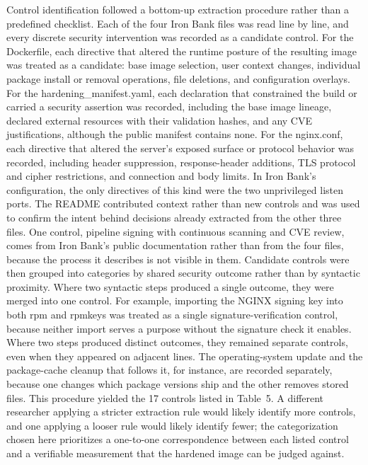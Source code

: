 \documentclass[10pt,letterpaper,twocolumn]{article}
\begin{document}
Control identification followed a bottom-up extraction procedure rather than a predefined checklist. Each of the four Iron Bank files was read line by line, and every discrete security intervention was recorded as a candidate control. For the Dockerfile, each directive that altered the runtime posture of the resulting image was treated as a candidate: base image selection, user context changes, individual package install or removal operations, file deletions, and configuration overlays. For the hardening\_manifest.yaml, each declaration that constrained the build or carried a security assertion was recorded, including the base image lineage, declared external resources with their validation hashes, and any CVE justifications, although the public manifest contains none. For the nginx.conf, each directive that altered the server's exposed surface or protocol behavior was recorded, including header suppression, response-header additions, TLS protocol and cipher restrictions, and connection and body limits. In Iron Bank's configuration, the only directives of this kind were the two unprivileged listen ports. The README contributed context rather than new controls and was used to confirm the intent behind decisions already extracted from the other three files. One control, pipeline signing with continuous scanning and CVE review, comes from Iron Bank's public documentation rather than from the four files, because the process it describes is not visible in them. Candidate controls were then grouped into categories by shared security outcome rather than by syntactic proximity. Where two syntactic steps produced a single outcome, they were merged into one control. For example, importing the NGINX signing key into both rpm and rpmkeys was treated as a single signature-verification control, because neither import serves a purpose without the signature check it enables. Where two steps produced distinct outcomes, they remained separate controls, even when they appeared on adjacent lines. The operating-system update and the package-cache cleanup that follows it, for instance, are recorded separately, because one changes which package versions ship and the other removes stored files. This procedure yielded the 17 controls listed in Table~5. A different researcher applying a stricter extraction rule would likely identify more controls, and one applying a looser rule would likely identify fewer; the categorization chosen here prioritizes a one-to-one correspondence between each listed control and a verifiable measurement that the hardened image can be judged against.
\end{document}
